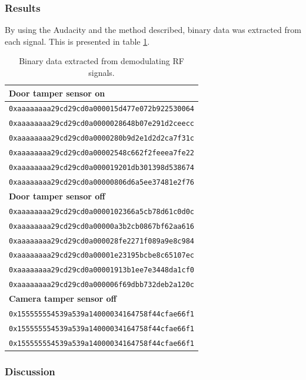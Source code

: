 \subsubsection{Results}
By using the Audacity and the method described, binary data was extracted from each signal. This is presented in table \ref{tb:demodulated-data}.
\begin{table}[!ht]
    \centering
    \begin{tabularx}{\textwidth}{l}
        \hline
        \textbf{Door tamper sensor on} \\ \hline
        \texttt{0xaaaaaaaa29cd29cd0a000015d477e072b922530064} \\
        \texttt{0xaaaaaaaa29cd29cd0a0000028648b07e291d2ceecc} \\
        \texttt{0xaaaaaaaa29cd29cd0a0000280b9d2e1d2d2ca7f31c} \\
        \texttt{0xaaaaaaaa29cd29cd0a00002548c662f2feeea7fe22} \\
        \texttt{0xaaaaaaaa29cd29cd0a000019201db301398d538674} \\
        \texttt{0xaaaaaaaa29cd29cd0a00000806d6a5ee37481e2f76} \\
        \hline
        
        \textbf{Door tamper sensor off} \\ \hline
        \texttt{0xaaaaaaaa29cd29cd0a0000102366a5cb78d61c0d0c} \\
        \texttt{0xaaaaaaaa29cd29cd0a00000a3b2cb0867bf62aa616} \\
        \texttt{0xaaaaaaaa29cd29cd0a000028fe2271f089a9e8c984} \\
        \texttt{0xaaaaaaaa29cd29cd0a00001e23195bcbe8c65107ec} \\
        \texttt{0xaaaaaaaa29cd29cd0a00001913b1ee7e3448da1cf0} \\
        \texttt{0xaaaaaaaa29cd29cd0a000006f69dbb732deb2a120c} \\
        \hline
        
        \textbf{Camera tamper sensor off} \\ \hline
        \texttt{0x155555554539a539a14000034164758f44cfae66f1} \\
        \texttt{0x155555554539a539a14000034164758f44cfae66f1} \\
        \texttt{0x155555554539a539a14000034164758f44cfae66f1} \\
        \hline
    \end{tabularx}
    \caption{Binary data extracted from demodulating RF signals.}
    \label{tb:demodulated-data}
\end{table}

\subsubsection{Discussion}
\todo
